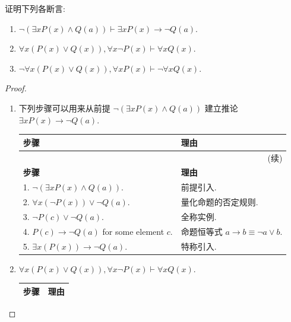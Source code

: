 \documentclass[10pt,UTF8]{book} %
\begin{document}
\begin{example}
    证明下列各断言: 
    \begin{enumerate}[itemsep=0pt, label={$\left.\arabic*\right)$}]
        \item $\lnot(\exists x P(x) \wedge Q(a)) \vdash \exists x P(x) \to \lnot Q(a)$.
        \item $\forall x \left(P(x) \vee Q(x)\right), \forall x \lnot P(x)
        \vdash \forall x Q(x)$.
        \item  $\lnot \forall x \left( P(x) \vee Q(x) \right), \forall x P(x)
        \vdash \lnot \forall x Q(x)$.
    \end{enumerate}
    \begin{proof}
        \begin{enumerate}[itemsep=0pt, label={$\left.\arabic*\right)$}]
            \item 下列步骤可以用来从前提 $\lnot(\exists x P(x) \wedge Q(a))$
            建立推论 $\exists x P(x) \to \lnot Q(a)$.
            {\begin{longtable}{p{}p{}}
                \toprule
            \textbf{步骤} & \textbf{理由} \\
            \midrule
            \endfirsthead

            \multicolumn{2}{r}{(续)} \\
            \toprule
            \textbf{步骤} & \textbf{理由} \\
            \midrule
            \endhead 

                \bottomrule
                \endfoot 

                1. $\lnot (\exists x P(x) \wedge Q(a))$. & 前提引入. \\
                2. $\forall x \left( \lnot P(x) \right) \vee \lnot Q(a)$.
                & 量化命题的否定规则. \\ 
                3. $\lnot P(c) \vee \lnot Q(a)$. & 全称实例. \\
                4. $P(c) \to \lnot Q(a)$ for some element $c$. & 命题恒等式 $a \to b \equiv \lnot a \vee b$. \\ 
                5. $\exists x \left( P(x) \right) \to \lnot Q(a) $. 
                & 特称引入. \\
            \end{longtable}}

            \item $\forall x \left(P(x) \vee Q(x)\right), \forall x \lnot P(x)
            \vdash \forall x Q(x)$.
            {\begin{longtable}{p{}p{}}
                \toprule
            \textbf{步骤} & \textbf{理由} \\
            \midrule
            \endfirsthead


\end{longtable}}
\end{enumerate}
\end{proof}
\end{example}
\end{document}
